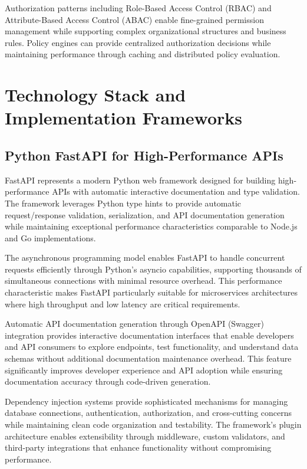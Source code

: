 Authorization patterns including Role-Based Access Control (RBAC) and Attribute-Based Access Control (ABAC) enable fine-grained permission management while supporting complex organizational structures and business rules. Policy engines can provide centralized authorization decisions while maintaining performance through caching and distributed policy evaluation.

\section{Technology Stack and Implementation Frameworks}

\subsection{Python FastAPI for High-Performance APIs}

FastAPI represents a modern Python web framework designed for building high-performance APIs with automatic interactive documentation and type validation. The framework leverages Python type hints to provide automatic request/response validation, serialization, and API documentation generation while maintaining exceptional performance characteristics comparable to Node.js and Go implementations.

The asynchronous programming model enables FastAPI to handle concurrent requests efficiently through Python's asyncio capabilities, supporting thousands of simultaneous connections with minimal resource overhead. This performance characteristic makes FastAPI particularly suitable for microservices architectures where high throughput and low latency are critical requirements.

Automatic API documentation generation through OpenAPI (Swagger) integration provides interactive documentation interfaces that enable developers and API consumers to explore endpoints, test functionality, and understand data schemas without additional documentation maintenance overhead. This feature significantly improves developer experience and API adoption while ensuring documentation accuracy through code-driven generation.

Dependency injection systems provide sophisticated mechanisms for managing database connections, authentication, authorization, and cross-cutting concerns while maintaining clean code organization and testability. The framework's plugin architecture enables extensibility through middleware, custom validators, and third-party integrations that enhance functionality without compromising performance.

